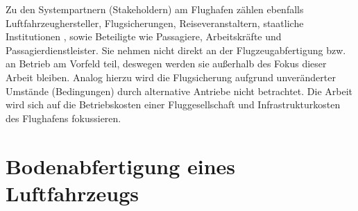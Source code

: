 Zu den Systempartnern (Stakeholdern) am Flughafen zählen ebenfalls Luftfahrzeughersteller, Flugsicherungen, 
Reiseveranstaltern, staatliche Institutionen \cite{maertens2023neue},
sowie Beteiligte wie Passagiere, Arbeitskräfte und Passagierdienstleister. 
Sie nehmen nicht direkt an der Flugzeugabfertigung bzw. an Betrieb am Vorfeld teil, deswegen werden sie außerhalb des Fokus dieser Arbeit bleiben.
Analog hierzu wird die Flugsicherung aufgrund unveränderter Umstände (Bedingungen) durch alternative Antriebe nicht betrachtet. 
Die Arbeit wird sich auf die Betriebskosten einer Fluggesellschaft und Infrastrukturkosten des Flughafens fokussieren.
%
%
%
%
%
%
%
%
\section{Bodenabfertigung eines Luftfahrzeugs}
\label{s:Bodenabfertigung eines Luftfahrzeugs}

